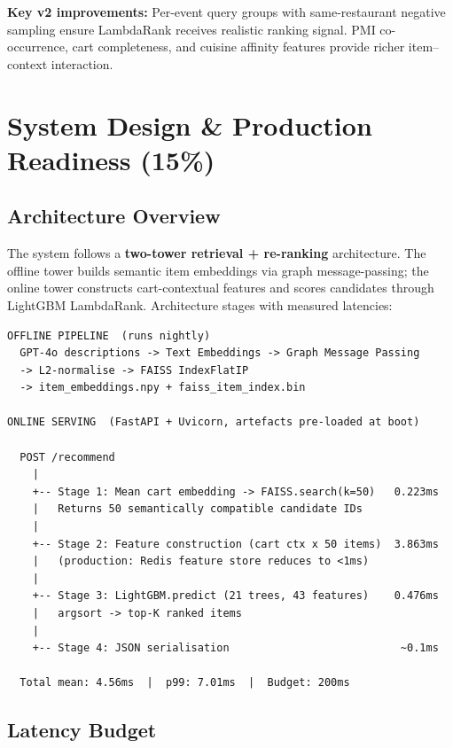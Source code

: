 \documentclass[11pt,a4paper]{article}
\begin{document}
\textbf{Key v2 improvements:} Per-event query groups with same-restaurant
negative sampling ensure LambdaRank receives realistic ranking signal.
PMI co-occurrence, cart completeness, and cuisine affinity features
provide richer item--context interaction.

\section{System Design \& Production Readiness (15\%)}

\subsection{Architecture Overview}

The system follows a \textbf{two-tower retrieval + re-ranking} architecture.
The offline tower builds semantic item embeddings via graph message-passing;
the online tower constructs cart-contextual features and scores candidates
through LightGBM LambdaRank.
Architecture stages with measured latencies:

\begin{archbox}
\begin{lstlisting}
OFFLINE PIPELINE  (runs nightly)
  GPT-4o descriptions -> Text Embeddings -> Graph Message Passing
  -> L2-normalise -> FAISS IndexFlatIP
  -> item_embeddings.npy + faiss_item_index.bin

ONLINE SERVING  (FastAPI + Uvicorn, artefacts pre-loaded at boot)

  POST /recommend
    |
    +-- Stage 1: Mean cart embedding -> FAISS.search(k=50)   0.223ms
    |   Returns 50 semantically compatible candidate IDs
    |
    +-- Stage 2: Feature construction (cart ctx x 50 items)  3.863ms
    |   (production: Redis feature store reduces to <1ms)
    |
    +-- Stage 3: LightGBM.predict (21 trees, 43 features)    0.476ms
    |   argsort -> top-K ranked items
    |
    +-- Stage 4: JSON serialisation                           ~0.1ms

  Total mean: 4.56ms  |  p99: 7.01ms  |  Budget: 200ms
\end{lstlisting}
\end{archbox}

\subsection{Latency Budget}
\end{document}
